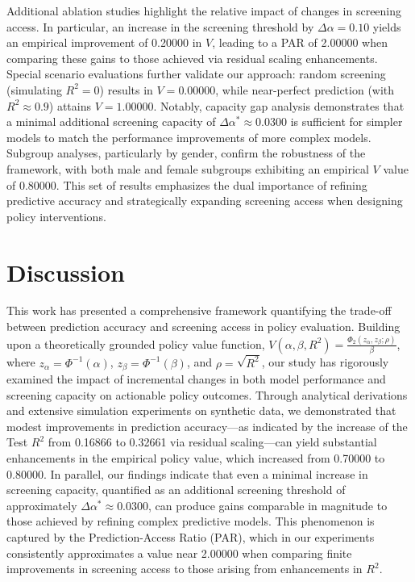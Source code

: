 \documentclass{article} %
\begin{document}
Additional ablation studies highlight the relative impact of changes in screening access. In particular, an increase in the screening threshold by \(\Delta\alpha=0.10\) yields an empirical improvement of 0.20000 in \(V\), leading to a PAR of 2.00000 when comparing these gains to those achieved via residual scaling enhancements. Special scenario evaluations further validate our approach: random screening (simulating \(R^2=0\)) results in \(V=0.00000\), while near-perfect prediction (with \(R^2\approx0.9\)) attains \(V=1.00000\). Notably, capacity gap analysis demonstrates that a minimal additional screening capacity of \(\Delta\alpha^*\approx0.0300\) is sufficient for simpler models to match the performance improvements of more complex models. Subgroup analyses, particularly by gender, confirm the robustness of the framework, with both male and female subgroups exhibiting an empirical \(V\) value of 0.80000. This set of results emphasizes the dual importance of refining predictive accuracy and strategically expanding screening access when designing policy interventions.

\section{Discussion}
This work has presented a comprehensive framework quantifying the trade-off between prediction accuracy and screening access in policy evaluation. Building upon a theoretically grounded policy value function, \( V(\alpha,\beta,R^2)=\frac{\Phi_2(z_\alpha,z_\beta;\rho)}{\beta} \), where \( z_\alpha=\Phi^{-1}(\alpha) \), \( z_\beta=\Phi^{-1}(\beta) \), and \(\rho=\sqrt{R^2}\), our study has rigorously examined the impact of incremental changes in both model performance and screening capacity on actionable policy outcomes. Through analytical derivations and extensive simulation experiments on synthetic data, we demonstrated that modest improvements in prediction accuracy—as indicated by the increase of the Test \(R^2\) from 0.16866 to 0.32661 via residual scaling—can yield substantial enhancements in the empirical policy value, which increased from 0.70000 to 0.80000. In parallel, our findings indicate that even a minimal increase in screening capacity, quantified as an additional screening threshold of approximately \(\Delta\alpha^* \approx 0.0300\), can produce gains comparable in magnitude to those achieved by refining complex predictive models. This phenomenon is captured by the Prediction-Access Ratio (PAR), which in our experiments consistently approximates a value near 2.00000 when comparing finite improvements in screening access to those arising from enhancements in \( R^2 \).
\end{document}
